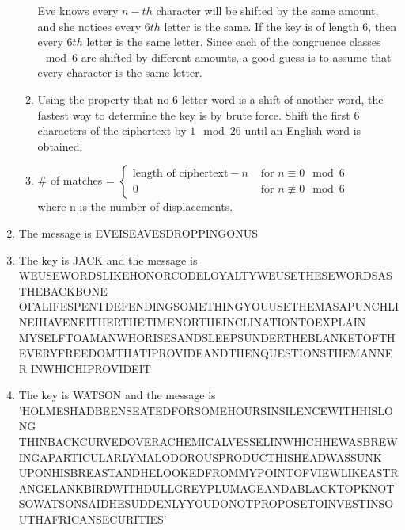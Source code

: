 \documentclass[10pt]{article}
\begin{document}
\begin{enumerate}[label=\arabic*.]
\begin{enumerate}
        Eve knows every $n-th$ character will be shifted by the same amount, and she notices every $6th$ letter is the same.
        If the key is of length $6$, then every $6th$ letter is the same letter.
        Since each of the congruence classes $\mod6$ are shifted by different amounts, a good guess is to assume that every character is the same letter.
        \item Using the property that no $6$ letter word is a shift of another word, the fastest way to determine the key is by brute force. 
        Shift the first $6$ characters of the ciphertext by $1\mod 26$ until an English word is obtained.
        \item \# of matches = $\begin{cases}
            \text{length of ciphertext}-n & \text{ for }n\equiv0\mod6\\
            0 & \text{ for }n\not\equiv0\mod6
        \end{cases}$\\
        where n is the number of displacements.
    \end{enumerate}
    \item The message is EVEISEAVESDROPPINGONUS
    \item The key is JACK and the message is WEUSEWORDSLIKEHONORCODELOYALTYWEUSETHESEWORDSASTHEBACKBONE
    OFALIFESPENTDEFENDINGSOMETHINGYOUUSETHEMASAPUNCHLINEIHAVENEITHERTHETIMENORTHEINCLINATIONTOEXPLAIN
    MYSELFTOAMANWHORISESANDSLEEPSUNDERTHEBLANKETOFTHEVERYFREEDOMTHATIPROVIDEANDTHENQUESTIONSTHEMANNER
    INWHICHIPROVIDEIT
    \item The key is WATSON and the message is 'HOLMESHADBEENSEATEDFORSOMEHOURSINSILENCEWITHHISLONG
    THINBACKCURVEDOVERACHEMICALVESSELINWHICHHEWASBREWINGAPARTICULARLYMALODOROUSPRODUCTHISHEADWASSUNK
    UPONHISBREASTANDHELOOKEDFROMMYPOINTOFVIEWLIKEASTRANGELANKBIRDWITHDULLGREYPLUMAGEANDABLACKTOPKNOT
    SOWATSONSAIDHESUDDENLYYOUDONOTPROPOSETOINVESTINSOUTHAFRICANSECURITIES'
\end{enumerate}

\end{document}
